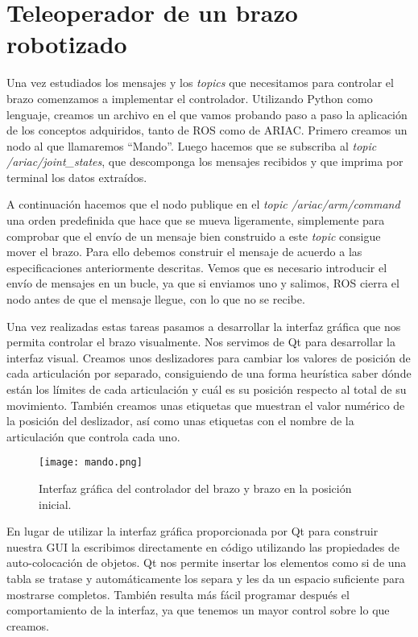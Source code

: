 \section{Teleoperador de un brazo robotizado}
\label{sec:br_teleoperador}

Una vez estudiados los mensajes y los \textit{topics} que necesitamos para controlar el brazo comenzamos a implementar el controlador. Utilizando Python como lenguaje, creamos un archivo en el que vamos probando paso a paso la aplicación de los conceptos adquiridos, tanto de ROS como de ARIAC. 
Primero creamos un nodo al que llamaremos “Mando”. Luego hacemos que se subscriba al \textit{topic} \textit{/ariac/joint\_states}, que descomponga los mensajes recibidos y que imprima por terminal los datos extraídos. 

A continuación hacemos que el nodo publique en el \textit{topic /ariac/arm/command} una orden predefinida que hace que se mueva ligeramente, simplemente para comprobar que el envío de un mensaje bien construido a este \textit{topic} consigue mover el brazo. Para ello debemos construir el mensaje de acuerdo a las especificaciones anteriormente descritas. Vemos que es necesario introducir el envío de mensajes en un bucle, ya que si enviamos uno y salimos, ROS cierra el nodo antes de que el mensaje llegue, con lo que no se recibe.

Una vez realizadas estas tareas pasamos a desarrollar la interfaz gráfica que nos permita controlar el brazo visualmente. Nos servimos de Qt para desarrollar la interfaz visual. Creamos unos deslizadores para cambiar los valores de posición de cada articulación por separado, consiguiendo de una forma heurística saber dónde están los límites de cada articulación y cuál es su posición respecto al total de su movimiento. También creamos unas etiquetas que muestran el valor numérico de la posición del deslizador, así como unas etiquetas con el nombre de la articulación que controla cada uno. 

\begin{figure}[]
	\centering\texttt{[image: mando.png]}
	\caption{Interfaz gráfica del controlador del brazo y brazo en la posición inicial.}
	\label{fig:mando}
\end{figure}

En lugar de utilizar la interfaz gráfica proporcionada por Qt para construir nuestra GUI la escribimos directamente en código utilizando las propiedades de auto-colocación de objetos. Qt nos permite insertar los elementos como si de una tabla se tratase y automáticamente los separa y les da un espacio suficiente para mostrarse completos. También resulta más fácil programar después el comportamiento de la interfaz, ya que tenemos un mayor control sobre lo que creamos. 

